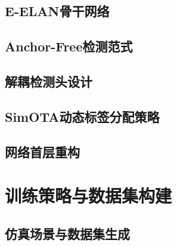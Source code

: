 \subsection{E-ELAN骨干网络}


\subsection{Anchor-Free检测范式}


\subsection{解耦检测头设计}


\subsection{SimOTA动态标签分配策略}


\subsection{网络首层重构}


\section{训练策略与数据集构建}

\subsection{仿真场景与数据集生成}

